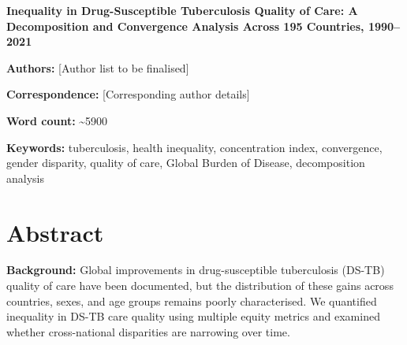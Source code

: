 \documentclass[12pt]{article}
\begin{document}

\begin{titlepage}
\centering
\vspace*{2cm}

{\LARGE\bfseries Inequality in Drug-Susceptible Tuberculosis Quality of Care: A Decomposition and Convergence Analysis Across 195 Countries, 1990--2021\par}

\vspace{2cm}

{\large\textbf{Authors:} [Author list to be finalised]\par}

\vspace{1cm}

{\large\textbf{Correspondence:} [Corresponding author details]\par}

\vspace{1cm}

{\large\textbf{Word count:} \textasciitilde 5900\par}

\vspace{1cm}

{\large\textbf{Keywords:} tuberculosis, health inequality, concentration index, convergence, gender disparity, quality of care, Global Burden of Disease, decomposition analysis\par}

\vfill

\end{titlepage}


\section*{Abstract}

\textbf{Background:} Global improvements in drug-susceptible tuberculosis (DS-TB) quality of care have been documented, but the distribution of these gains across countries, sexes, and age groups remains poorly characterised. We quantified inequality in DS-TB care quality using multiple equity metrics and examined whether cross-national disparities are narrowing over time.
\end{document}
